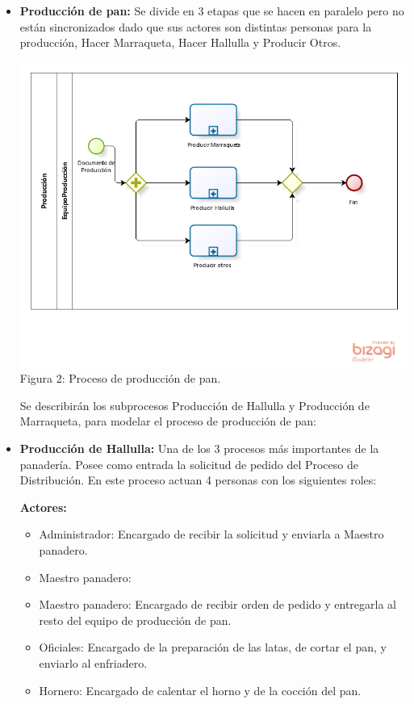 \begin{itemize}

\item \textbf{Producción de pan:} Se divide en 3 etapas que se hacen en paralelo pero no están sincronizados dado que sus actores son distintas personas para la producción, Hacer Marraqueta, Hacer Hallulla y Producir Otros.

\begin{center}
\includegraphics[width=13cm]{./imagenes/produccion_pan.png}\\
Figura 2: Proceso de producción de pan.
\end{center}

Se describir\'an los subprocesos Producci\'on de Hallulla y Producci\'on de Marraqueta, para modelar el proceso de producci\'on de pan:
\item \textbf{Producción de Hallulla:} Una de los 3 procesos más importantes de la panadería. Posee como entrada la solicitud de pedido del Proceso de Distribución. En este proceso actuan 4 personas con los siguientes roles:

\textbf{Actores:}
\begin{itemize}
\item Administrador: Encargado de recibir la solicitud y enviarla a Maestro panadero.
\item Maestro panadero: \item Maestro panadero: Encargado de recibir orden de pedido y entregarla al resto del equipo de producción de pan.
\item Oficiales: Encargado de la preparación de las latas, de cortar el pan, y enviarlo al enfriadero.
\item Hornero: Encargado de calentar el horno y de la cocción del pan.
\end{itemize} 


\end{itemize}
